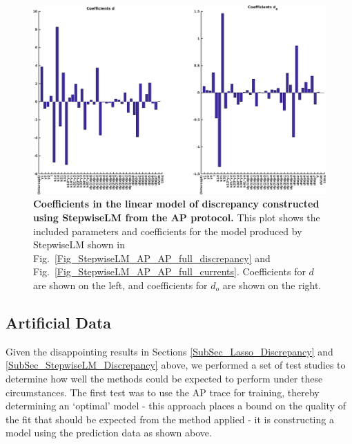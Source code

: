 \documentclass[11pt,a4paper,oneside]{article}
\begin{document}
\clearpage

\begin{figure}[t]
\begin{center}
\includegraphics[scale=0.42]{Figures/StepwiseLM_AP_AP_full_coefficients.png}
\caption{\textbf{Coefficients in the linear model of discrepancy constructed using StepwiseLM from the AP protocol.} This plot shows the included parameters and coefficients for the model produced by StepwiseLM shown in Fig.~\ref{Fig_StepwiseLM_AP_AP_full_discrepancy} and Fig.~\ref{Fig_StepwiseLM_AP_AP_full_currents}. Coefficients for $d$ are shown on the left, and coefficients for $d_o$ are shown on the right.} 
\label{Fig_StepwiseLM_AP_AP_full_coefficients}
\end{center}
\end{figure}

\clearpage


\subsection{Artificial Data}
Given the disappointing results in Sections \ref{SubSec_Lasso_Discrepancy} and \ref{SubSec_StepwiseLM_Discrepancy} above, we performed a set of test studies to determine how well the methods could be expected to perform under these circumstances. The first test was to use the AP trace for training, thereby determining an `optimal' model - this approach places a bound on the quality of the fit that should be expected from the method applied - it is constructing a model using the prediction data as shown above. 
\end{document}

